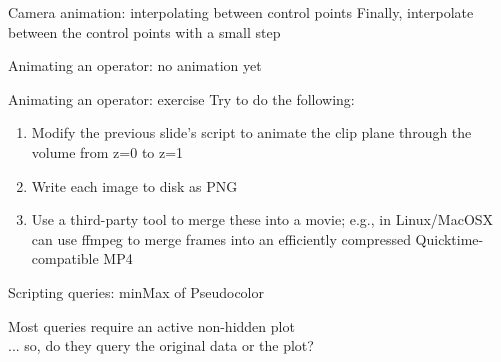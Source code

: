 \begin{frame}{Camera animation: interpolating between control points}
  Finally, interpolate between the control points with a small step
  
\end{frame}

\begin{frame}{Animating an operator: no animation yet}
  
\end{frame}


\begin{frame}{Animating an operator: exercise}
  \qquad Try to do the following:\bigskip
  \begin{enumerate}\setlength{\itemsep}{3mm}
  \item Modify the previous slide's script to animate the clip plane through the volume from z=0 to z=1
  \item Write each image to disk as PNG
  \item Use a third-party tool to merge these into a movie;
    e.g., in Linux/MacOSX can use ffmpeg to merge frames into an efficiently compressed
    Quicktime-compatible MP4\ffmpeg
  \end{enumerate}
\end{frame}


\begin{frame}{Scripting queries: minMax of Pseudocolor}
  
  \begin{block}{}{}\vspace{-3mm}\outIdentical\vspace{-3mm}\end{block}
  \bigskip
  Most queries require an active non-hidden plot\\ ... so, do they query the original data or the plot?
\end{frame}

